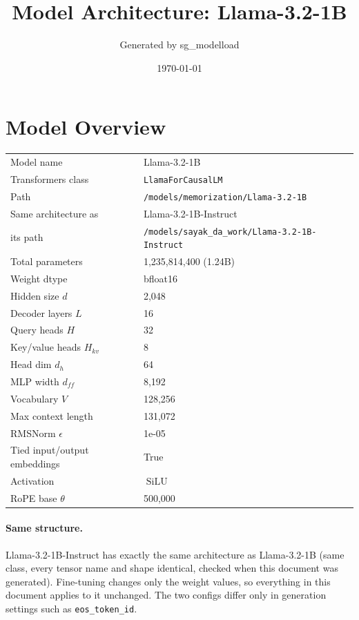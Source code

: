 \documentclass[10pt,a4paper]{article}
\title{Model Architecture: Llama-3.2-1B}
\author{Generated by sg\_modelload}
\date{\today}
\newcommand{\op}[1]{\operatorname{#1}}
\theoremstyle{definition}
\begin{document}
\maketitle
\tableofcontents
\clearpage
\section{Model Overview}
\begin{tabular}{ll}
\toprule
Model name & Llama-3.2-1B \\
Transformers class & \texttt{LlamaForCausalLM} \\
Path & \texttt{/models/memorization/Llama-3.\allowbreak{}2-1B} \\
Same architecture as & Llama-3.2-1B-Instruct \\
\quad its path & \texttt{/models/sayak\_da\_work/Llama-3.\allowbreak{}2-1B-Instruct} \\
Total parameters & 1,235,814,400 (1.24B) \\
Weight dtype & bfloat16 \\
\midrule
Hidden size $d$ & 2,048 \\
Decoder layers $L$ & 16 \\
Query heads $H$ & 32 \\
Key/value heads $H_{kv}$ & 8 \\
Head dim $d_h$ & 64 \\
MLP width $d_{ff}$ & 8,192 \\
Vocabulary $V$ & 128,256 \\
Max context length & 131,072 \\
RMSNorm $\epsilon$ & 1e-05 \\
Tied input/output embeddings & True \\
Activation & $\op{SiLU}$ \\
RoPE base $\theta$ & 500,000 \\
\bottomrule
\end{tabular}

\paragraph{Same structure.} Llama-3.2-1B-Instruct has exactly the same architecture as Llama-3.2-1B (same class, every tensor name and shape identical, checked when this document was generated). Fine-tuning changes only the weight values, so everything in this document applies to it unchanged. The two configs differ only in generation settings such as \texttt{eos\_token\_id}.
\end{document}
